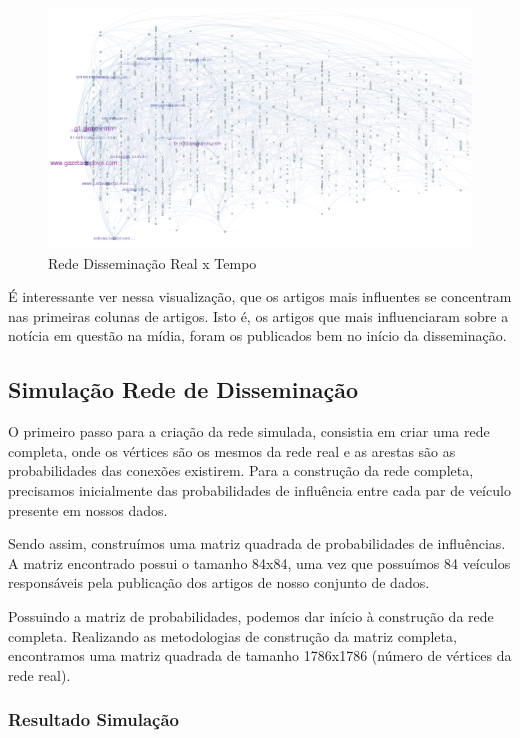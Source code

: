 \documentclass[a4paper,12pt]{article}
\begin{document}
\pagebreak
\begin{figure}[ht]
 \includegraphics[scale=0.5]{../results/t.png}
 \caption{Rede Disseminação Real x Tempo}
\end{figure}

É interessante ver nessa visualização, que os artigos mais influentes se concentram nas primeiras colunas de artigos. Isto é, os artigos que mais
influenciaram sobre a notícia em questão na mídia, foram os publicados bem no início da disseminação.


\subsection{Simulação Rede de Disseminação}

O primeiro passo para a criação da rede simulada, consistia em criar uma rede completa, onde os vértices são os mesmos
da rede real e as arestas são as probabilidades das conexões existirem. Para a construção da rede completa, precisamos
inicialmente das probabilidades de influência entre cada par de veículo presente em nossos dados.

Sendo assim, construímos uma matriz quadrada de probabilidades de influências. A matriz encontrado possui o tamanho 84x84, uma vez que
possuímos 84 veículos responsáveis pela publicação dos artigos de nosso conjunto de dados.

Possuindo a matriz de probabilidades, podemos dar início à construção da rede completa. Realizando as metodologias de construção da matriz
completa, encontramos uma matriz quadrada de tamanho 1786x1786 (número de vértices da rede real). 

\pagebreak
\subsubsection{Resultado Simulação}
\end{document}
